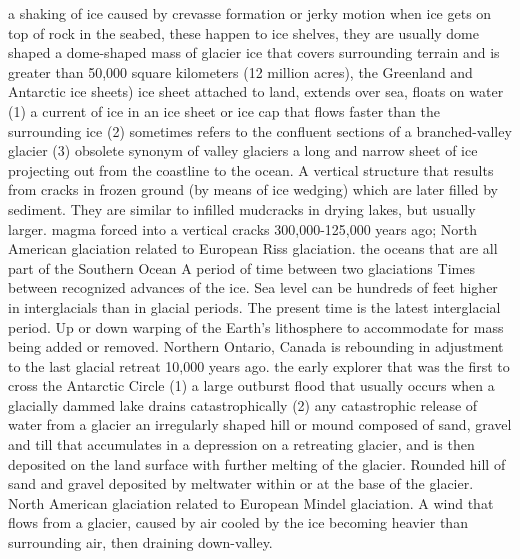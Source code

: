  a shaking of ice caused by crevasse formation or jerky motion
 when ice gets on top of rock in the seabed, these happen to ice shelves, they are usually dome shaped
 a dome-shaped mass of glacier ice that covers surrounding terrain and is greater than 50,000 square kilometers (12 million acres), the Greenland and Antarctic ice sheets)
 ice sheet attached to land, extends over sea, floats on water
 (1) a current of ice in an ice sheet or ice cap that flows faster than the surrounding ice (2) sometimes refers to the confluent sections of a branched-valley glacier (3) obsolete synonym of valley glaciers
 a long and narrow sheet of ice projecting out from the coastline to the ocean.
 A vertical structure that results from cracks in frozen ground (by means of ice wedging) which are later filled by sediment. They are similar to infilled mudcracks in drying lakes, but usually larger.
 magma forced into a vertical cracks
 300,000-125,000 years ago; North American glaciation related to European Riss glaciation.
 the oceans that are all part of the Southern Ocean
 A period of time between two glaciations
 Times between recognized advances of the ice. Sea level can be hundreds of feet higher in interglacials than in glacial periods. The present time is the latest interglacial period.
 Up or down warping of the Earth's lithosphere to accommodate for mass being added or removed. Northern Ontario, Canada is rebounding in adjustment to the last glacial retreat 10,000 years ago.
 the early explorer that was the first to cross the Antarctic Circle
 (1) a large outburst flood that usually occurs when a glacially dammed lake drains catastrophically (2) any catastrophic release of water from a glacier
 an irregularly shaped hill or mound composed of sand, gravel and till that accumulates in a depression on a retreating glacier, and is then deposited on the land surface with further melting of the glacier.
 Rounded hill of sand and gravel deposited by meltwater within or at the base of the glacier.
 North American glaciation related to European Mindel glaciation.
 A wind that flows from a glacier, caused by air cooled by the ice becoming heavier than surrounding air, then draining down-valley.
